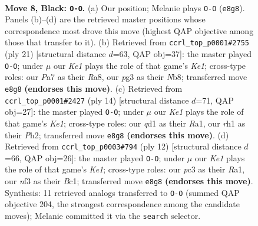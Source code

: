 \documentclass[11pt]{article}
\begin{document}
\begin{figure}[p]\centering
\begin{subfigure}{0.46\textwidth}\centering
\resizebox{\linewidth}{!}{%
\newchessgame
\chessboard[
  setfen={r1b1k2r/ppppqpp1/2n1pn1p/8/2PP3P/2P2NP1/P2BPP2/R2QKB1R b KQkq - 0 8},
  showmover=false,
  pgfstyle=straightmove, color=movearrow, markmove={e8-g8}
]}
\caption{}
\end{subfigure}\hfill
\begin{subfigure}{0.46\textwidth}\centering
\resizebox{\linewidth}{!}{%
\newchessgame
\chessboard[
  setfen={rn1qk2r/pbpp2pp/1p2pp2/5n2/2PP4/P4NP1/1P1BPP1P/2RQKB1R b Kkq - 1 11},
  showmover=false,
  pgfstyle=straightmove, color=movearrow, markmove={e8-g8}
]}
\caption{}
\end{subfigure}
\\[4pt]
\begin{subfigure}{0.46\textwidth}\centering
\resizebox{\linewidth}{!}{%
\newchessgame
\chessboard[
  setfen={r1bqkb1r/p4ppp/2p1pn2/2pp4/4PP2/2NP1N2/PPP3PP/R1BQK2R w KQkq - 0 8},
  showmover=false,
  pgfstyle=straightmove, color=movearrow, markmove={e1-g1}
]}
\caption{}
\end{subfigure}\hfill
\begin{subfigure}{0.46\textwidth}\centering
\resizebox{\linewidth}{!}{%
\newchessgame
\chessboard[
  setfen={r1bqk2r/pp2bppp/2np1n2/2p1p3/2P5/2NP1NP1/PP2PPBP/R1BQK2R w KQkq - 2 7},
  showmover=false,
  pgfstyle=straightmove, color=movearrow, markmove={e1-g1}
]}
\caption{}
\end{subfigure}
\caption{\textbf{Move 8, Black: \texttt{O-O}.} (a) Our position; Melanie plays \texttt{O-O} (\texttt{e8g8}). Panels (b)--(d) are the retrieved master positions whose correspondence most drove this move (highest QAP objective among those that transfer to it). (b) Retrieved from \texttt{ccrl\_top\_p0001\#2755} (ply 21) [structural distance $d$=63, QAP obj=37]: the master played \texttt{O-O}; under $\mu$ our \emph{Ke1} plays the role of that game's \emph{Ke1}; cross-type roles: our \emph{P}a7 as their \emph{R}a8, our \emph{p}g3 as their \emph{N}b8; transferred move \texttt{e8g8} \textbf{(endorses this move)}. (c) Retrieved from \texttt{ccrl\_top\_p0001\#2427} (ply 14) [structural distance $d$=71, QAP obj=27]: the master played \texttt{O-O}; under $\mu$ our \emph{Ke1} plays the role of that game's \emph{Ke1}; cross-type roles: our \emph{q}d1 as their \emph{R}a1, our \emph{r}h1 as their \emph{P}h2; transferred move \texttt{e8g8} \textbf{(endorses this move)}. (d) Retrieved from \texttt{ccrl\_top\_p0003\#794} (ply 12) [structural distance $d$=66, QAP obj=26]: the master played \texttt{O-O}; under $\mu$ our \emph{Ke1} plays the role of that game's \emph{Ke1}; cross-type roles: our \emph{p}c3 as their \emph{R}a1, our \emph{n}f3 as their \emph{B}c1; transferred move \texttt{e8g8} \textbf{(endorses this move)}. Synthesis: 11 retrieved analogs transferred to \texttt{O-O} (summed QAP objective 204, the strongest correspondence among the candidate moves); Melanie committed it via the \texttt{search} selector.}
\label{fig:thought-m15}
\end{figure}
\end{document}
